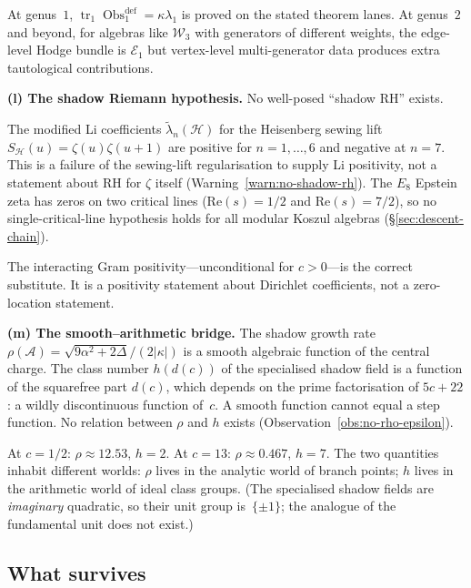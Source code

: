 \documentclass[11pt]{article}
\newcommand{\cA}{\mathcal{A}}
\newcommand{\cW}{\mathcal{W}}
\newcommand{\cH}{\mathcal{H}}
\newcommand{\cE}{\mathcal{E}}
\begin{document}
At genus~$1$,
$\operatorname{tr}_1\operatorname{Obs}^{\mathrm{def}}_1
=\kappa\lambda_1$ is proved on the stated theorem lanes.  At
genus~$2$ and beyond,
for algebras like $\cW_3$ with generators of different weights,
the edge-level Hodge bundle is $\cE_1$ but vertex-level
multi-generator data produces extra tautological contributions.

\medskip

\noindent\textbf{(l) The shadow Riemann hypothesis.}\enspace
No well-posed ``shadow RH'' exists.

The modified Li coefficients $\tilde\lambda_n(\cH)$ for the
Heisenberg sewing lift
$S_\cH(u) = \zeta(u)\zeta(u{+}1)$ are positive for
$n = 1, \ldots, 6$ and negative at $n = 7$.  This is a failure of
the sewing-lift regularisation to supply Li positivity, not a
statement about RH for $\zeta$ itself
(Warning~\ref{warn:no-shadow-rh}).  The $E_8$ Epstein zeta has
zeros on two critical lines ($\mathrm{Re}(s) = 1/2$ and
$\mathrm{Re}(s) = 7/2$), so no single-critical-line hypothesis
holds for all modular Koszul algebras
(\S\ref{sec:descent-chain}).

The interacting Gram positivity---unconditional for
$c > 0$---is the correct substitute.  It is a positivity
statement about Dirichlet coefficients, not a zero-location
statement.

\medskip

\noindent\textbf{(m) The smooth--arithmetic bridge.}\enspace
The shadow growth rate $\rho(\cA) = \sqrt{9\alpha^2 + 2\Delta}/
(2|\kappa|)$ is a smooth algebraic function of the central
charge.  The class number $h(d(c))$ of the
specialised shadow field is a function of the squarefree part
$d(c)$, which depends on the prime factorisation of
$5c + 22$: a wildly discontinuous function of~$c$.  A smooth
function cannot equal a step function.  No relation between
$\rho$ and $h$ exists
(Observation~\ref{obs:no-rho-epsilon}).

At $c = 1/2$: $\rho \approx 12.53$,
$h = 2$.
At $c = 13$: $\rho \approx 0.467$,
$h = 7$.
The two quantities inhabit different worlds: $\rho$ lives in
the analytic world of branch points; $h$ lives in the
arithmetic world of ideal class groups.  (The specialised
shadow fields are \emph{imaginary} quadratic, so their unit
group is~$\{\pm 1\}$; the analogue of the fundamental unit
does not exist.)

\subsection{What survives}
\end{document}

